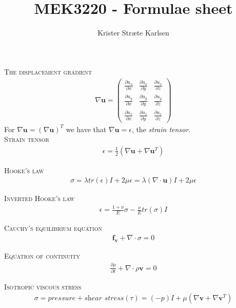 \documentclass[11pt,a4paper,english]{article}
\title{MEK3220 - Formulae sheet}
\author{Krister Stræte Karlsen}
\begin{document}
\maketitle

{\scshape The displacement gradient} 
\begin{align*}
\nabla \mathbf{u} = 
\begin{pmatrix}	    \frac{\partial u_x}{ \partial x} & \frac{\partial u_x}{ \partial y} & \frac{\partial u_x}{ \partial z}      \\
                		\frac{\partial u_y}{ \partial x} & \frac{\partial u_y}{ \partial y} & \frac{\partial u_y}{ \partial z}     \\
               	 	\frac{\partial u_z}{ \partial x} & \frac{\partial u_z}{ \partial y} &\frac{\partial u_z}{ \partial z}     
\end{pmatrix}
\end{align*}
\hspace{1cm} For $ \nabla \mathbf{u} =  ( \nabla \mathbf{u})^T  $ we have that $\nabla \mathbf{u} = \epsilon $, the \emph{strain tensor}.\\

{\scshape Strain tensor} 
\begin{align*}
\epsilon = \frac{1}{2}(\nabla \mathbf{u} + \nabla \mathbf{u}^T  ) 
\end{align*}

{\scshape Hooke's law} 
\begin{align*}
\sigma  = \lambda tr(\epsilon) I + 2\mu \epsilon =  \lambda (\nabla \cdot \mathbf{u}) I + 2\mu \epsilon
\end{align*}

{\scshape Inverted Hooke's law} 
\begin{align*}
\epsilon = \frac{1+\nu}{E}\sigma - \frac{\nu}{E} tr(\sigma)I   
\end{align*}

{\scshape Cauchy's equilibrium equation} 
\begin{align*}
\mathbf{f_v} + \nabla \cdot \sigma = 0
\end{align*}

{\scshape Equation of continuity} 
\begin{align*}
\frac{\partial \rho}{\partial t} + \nabla \cdot  \rho \mathbf{v} = 0
\end{align*}

{\scshape Isotropic viscous stress} 
\begin{align*}
\sigma = pressure + \textit{shear stress}(\tau) =  (-p)I + \mu (\nabla \mathbf{v}  + \nabla \mathbf{v}^T  )
\end{align*}
\end{document}
